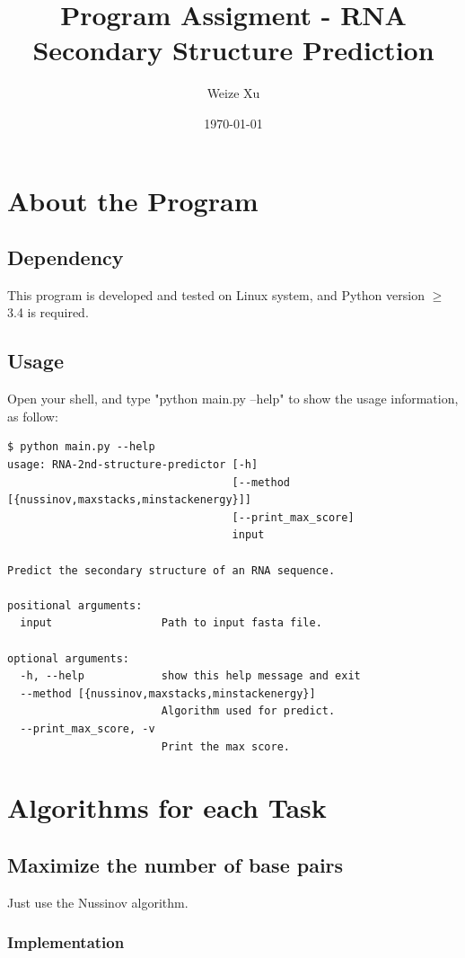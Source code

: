 \documentclass[10pt]{article}
\title{Program Assigment - RNA Secondary Structure Prediction}
\date{\today}
\author{Weize Xu}
\begin{document}
\maketitle

\section{About the Program}

\subsection{Dependency}
This program is developed and tested on Linux system,
and Python version $\geq$ 3.4 is required.

\subsection{Usage}

Open your shell, and type "python main.py --help" to show the usage information, as follow:

\begin{lstlisting}[frame=single]
$ python main.py --help
usage: RNA-2nd-structure-predictor [-h]
                                   [--method [{nussinov,maxstacks,minstackenergy}]]
                                   [--print_max_score]
                                   input

Predict the secondary structure of an RNA sequence.

positional arguments:
  input                 Path to input fasta file.

optional arguments:
  -h, --help            show this help message and exit
  --method [{nussinov,maxstacks,minstackenergy}]
                        Algorithm used for predict.
  --print_max_score, -v
                        Print the max score.
\end{lstlisting}

\section{Algorithms for each Task}

\subsection{Maximize the number of base pairs}
Just use the Nussinov algorithm.

\subsubsection{Implementation}
\end{document}
